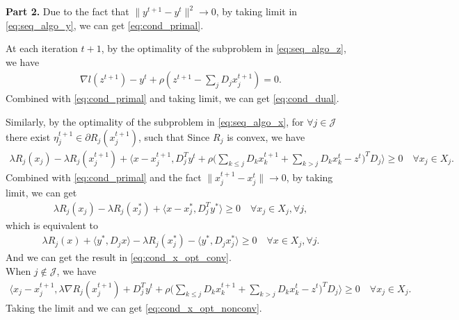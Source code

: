 {\bf Part 2.} Due to the fact that $\|y^{t+1}-y^t\|^2\rightarrow 0$, by taking limit in \eqref{eq:seq_algo_y}, we can get \eqref{eq:cond_primal}.

At each iteration $t+1$, by the optimality of the subproblem in \eqref{eq:seq_algo_z}, we have
\begin{align}
    \nabla l(z^{t+1}) - y^t + \rho (z^{t+1} - \sum_jD_jx_j^{t+1}) = 0.
\end{align}
Combined with \eqref{eq:cond_primal} and taking limit, we can get \eqref{eq:cond_dual}.

Similarly, by the optimality of the subproblem in \eqref{eq:seq_algo_x}, for $\forall j\in\mathcal{J}$ there exist $\eta_j^{t+1}\in\partial R_j(x_j^{t+1})$, such that
Since $R_j$ is convex, we have 
\begin{align}
    \lambda R_j(x_j) - \lambda R_j(x_j^{t+1}) + \big\langle x-x_j^{t+1}, D_j^Ty^t + \rho\big(\sum_{k\le j} D_kx_k^{t+1} + \sum_{k>j} D_kx_k^{t} - z^{t}\big)^T D_j\big\rangle \ge 0\quad \forall x_j\in X_j.
\end{align}
Combined with \eqref{eq:cond_primal} and the fact $\|x_j^{t+1} - x_j^{t}\|\rightarrow 0$, by taking limit, we can get
\begin{align}
    \lambda R_j(x_j) - \lambda R_j(x_j^*) + \big\langle x-x_j^{*}, D_j^Ty^* \big\rangle \ge 0\quad \forall x_j\in X_j, \forall j,
\end{align}
which is equivalent to 
\begin{align}
    \lambda R_j(x) + \big\langle y^*, D_jx \big\rangle- \lambda R_j(x_j^*) - \big\langle y^*, D_jx_j^{*} \big\rangle \ge 0\quad \forall x\in X_j, \forall j. 
\end{align}
And we can get the result in \eqref{eq:cond_x_opt_conv}. \\
When $j\not\in\mathcal{J}$, we have 
\begin{align}
    \big\langle x_j-x_j^{t+1}, \lambda \nabla R_j(x_j^{t+1}) + D_j^Ty^t + \rho\big(\sum_{k\le j} D_kx_k^{t+1} + \sum_{k>j} D_kx_k^{t} - z^{t}\big)^T D_j\big\rangle \ge 0\quad \forall x_j\in X_j.
\end{align}
Taking the limit and we can get \eqref{eq:cond_x_opt_nonconv}.

